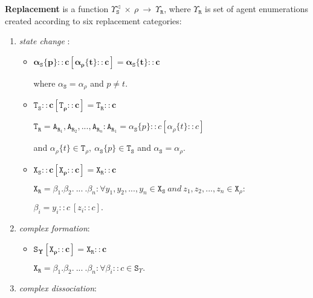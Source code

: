 \documentclass{entcs}
\renewcommand{\~}[0]{\texttildelow}
\begin{document}
\begin{definition}
$ $ \\
\textbf{Replacement} is a function $\Upsilon_\mathtt{S}^{\lhd}~\times~\rho~\rightarrow~\Upsilon_\mathtt{R}$, where $\Upsilon_\mathtt{R}$ is set of agent enumerations created according to six replacement categories:

\begin{enumerate}
\item \textit{state change }:

\begin{itemize}
\item $ \pmb{\alpha_\mathtt{S}\{p\}::c[\alpha_\rho\{t\}::c] = \alpha_\mathtt{\mathtt{S}}\{t\}::c} $

where $ \alpha_\mathtt{S} = \alpha_\rho $ and $p \neq t$.

\item $ \pmb{\mathtt{T}_\mathtt{S}::c[\mathtt{T}_\rho::c] = \mathtt{T}_\mathtt{R}::c}$ 

$\mathtt{T}_\mathtt{R} = \mathtt{A}_{\mathtt{R}_1}, \mathtt{A}_{\mathtt{R}_2}, ..., \mathtt{A}_{\mathtt{R}_n} : \mathtt{A}_{\mathtt{R}_1} = \alpha_\mathtt{S}\{p\}::c[\alpha_\rho\{t\}::c]$

and $\alpha_\rho\{t\} \in \mathtt{T}_\rho, ~\alpha_\mathtt{S}\{p\} \in \mathtt{T}_\mathtt{S} $ and $\alpha_\mathtt{S} = \alpha_\rho$.

\item $ \pmb{\mathtt{X}_\mathtt{S}::c[\mathtt{X}_\rho::c] = \mathtt{X}_\mathtt{R}::c}$

$ \mathtt{X}_\mathtt{R} = \beta_1.\beta_2. ~...~ .\beta_n \pmb{:} \forall y_1, y_2, ..., y_n \in \mathtt{X}_\mathtt{S}~and~z_1, z_2, ..., z_n \in \mathtt{X}_\rho \pmb{:}$

$\beta_i = y_i::c~[z_i::c].$

\end{itemize}

\item \textit{complex formation}:

\begin{itemize}
\item $\pmb{\mathtt{S}_\Upsilon[\mathtt{X}_\rho::c] = \mathtt{X}_\mathtt{R}::c}$

$\mathtt{X}_\mathtt{R} = \beta_1.\beta_2. ~...~ .\beta_n \pmb{:} \forall \beta_i::c \in \mathtt{S}_\Upsilon.$

\end{itemize}

\item \textit{complex dissociation}:


\end{enumerate}
\end{definition}
\end{document}
